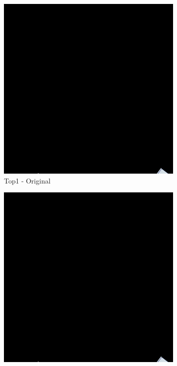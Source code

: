 \begin{figure}[H]
\centering
\begin{subfigure}{0.32\textwidth}
    \includegraphics[width=\textwidth]{02-main//figures/ch4/kfold_ensembles/linknet_timm-efficientnet-b5/worst_cases/worst_5_iou0.000_25051119_tile_18_9_ba3084_original.png}
    \caption{Top1 - Original}
\end{subfigure}
\hfill
\begin{subfigure}{0.32\textwidth}
    \includegraphics[width=\textwidth]{02-main//figures/ch4/kfold_ensembles/linknet_timm-efficientnet-b5/worst_cases/worst_5_iou0.000_25051119_tile_18_9_ba3084_overlay_gt.png}

\end{subfigure}
\end{figure}

